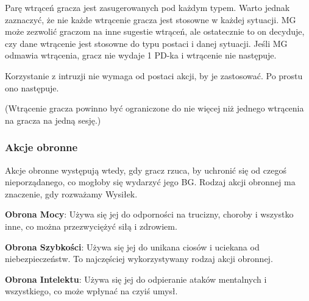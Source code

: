 Parę wtrąceń gracza jest zasugerowanych pod każdym typem. Warto jednak zaznaczyć, że nie każde wtrącenie gracza jest stosowne w każdej sytuacji. MG może zezwolić graczom na inne sugestie wtrąceń, ale ostatecznie to on decyduje, czy dane wtrącenie jest stosowne do typu postaci i danej sytuacji. Jeśli MG odmawia wtrącenia, gracz nie wydaje 1 PD-ka i wtrącenie nie następuje.

Korzystanie z intruzji nie wymaga od postaci akcji, by je zastosować. Po prostu ono następuje.

(Wtrącenie gracza powinno być ograniczone do nie więcej niż jednego wtrącenia na gracza na jedną sesję.)

\subsubsection{Akcje obronne}

Akcje obronne występują wtedy, gdy gracz rzuca, by uchronić się od czegoś nieporządanego, co mogłoby się wydarzyć jego BG. Rodzaj akcji obronnej ma znaczenie, gdy rozważamy Wysiłek.

\textbf{Obrona Mocy}: Używa się jej do odporności na trucizny, choroby i wszystko inne, co można przezwyciężyć siłą i zdrowiem.

\textbf{Obrona Szybkości}: Używa się jej do unikana ciosów i uciekana od niebezpieczeństw. To najczęściej wykorzystywany rodzaj akcji obronnej.

\textbf{Obrona Intelektu}: Używa się jej do odpieranie ataków mentalnych i wszystkiego, co może wpłynać na czyiś umysł.